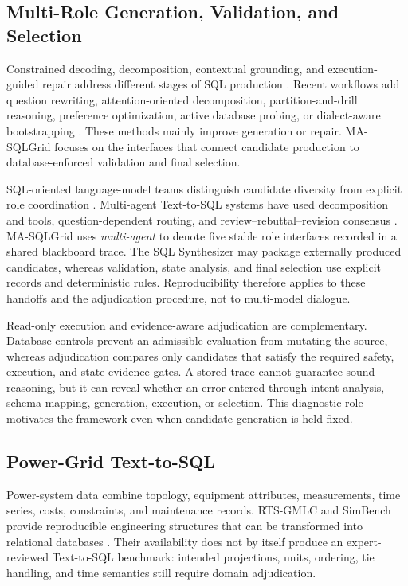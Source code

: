 \documentclass[applsci,article,submit,moreauthors]{Definitions/mdpi}
\newcommand{\masql}{MA-SQLGrid}
\begin{document}
\subsection{Multi-Role Generation, Validation, and Selection}

Constrained decoding, decomposition, contextual grounding, and execution-guided repair address different stages of SQL production \cite{scholak2021picard,nan2023enhancing,sun2023sqlprompt,pourreza2023dinsql,talaei2024chess}. Recent workflows add question rewriting, attention-oriented decomposition, partition-and-drill reasoning, preference optimization, active database probing, or dialect-aware bootstrapping \cite{mao2024dartsql,xie2024deasql,luo2024ptdsql,zhai2025executionfeedback,xie2026sdesql,zhang2025exesql}. These methods mainly improve generation or repair. \masql{} focuses on the interfaces that connect candidate production to database-enforced validation and final selection.

SQL-oriented language-model teams distinguish candidate diversity from explicit role coordination \cite{lee2025team}. Multi-agent Text-to-SQL systems have used decomposition and tools, question-dependent routing, and review--rebuttal--revision consensus \cite{wang2025macsql,shao2025qcmasql,xia2025r3}. \masql{} uses \emph{multi-agent} to denote five stable role interfaces recorded in a shared blackboard trace. The SQL Synthesizer may package externally produced candidates, whereas validation, state analysis, and final selection use explicit records and deterministic rules. Reproducibility therefore applies to these handoffs and the adjudication procedure, not to multi-model dialogue.

Read-only execution and evidence-aware adjudication are complementary. Database controls prevent an admissible evaluation from mutating the source, whereas adjudication compares only candidates that satisfy the required safety, execution, and state-evidence gates. A stored trace cannot guarantee sound reasoning, but it can reveal whether an error entered through intent analysis, schema mapping, generation, execution, or selection. This diagnostic role motivates the framework even when candidate generation is held fixed.

\subsection{Power-Grid Text-to-SQL}

Power-system data combine topology, equipment attributes, measurements, time series, costs, constraints, and maintenance records. RTS-GMLC and SimBench provide reproducible engineering structures that can be transformed into relational databases \cite{barrows2020rts,meinecke2020simbench}. Their availability does not by itself produce an expert-reviewed Text-to-SQL benchmark: intended projections, units, ordering, tie handling, and time semantics still require domain adjudication.
\end{document}
